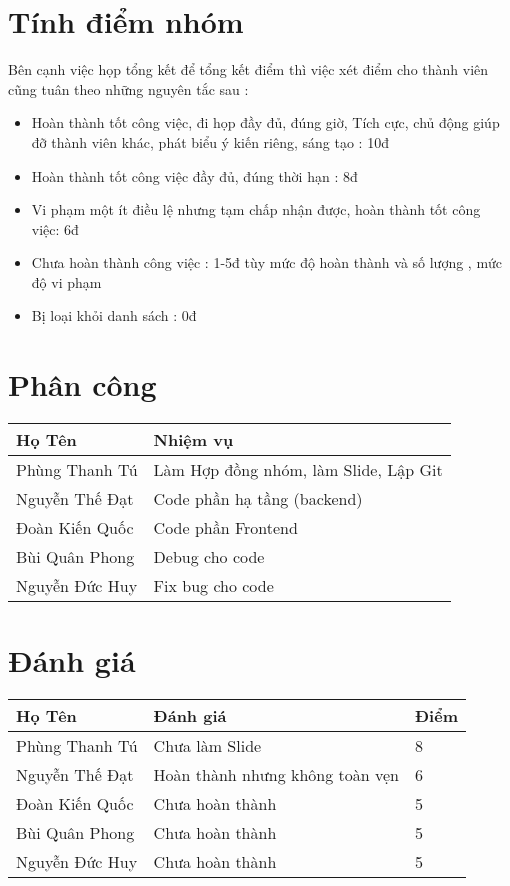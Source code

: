 \documentclass[12pt]{article}
\begin{document}
\begin{titlepage}
\section{Tính điểm nhóm}
Bên cạnh việc họp tổng kết để tổng kết điểm thì việc xét điểm cho thành viên cũng tuân theo những nguyên tắc sau :
\begin{itemize}
    \item Hoàn thành tốt công việc, đi họp đầy đủ, đúng giờ, Tích cực, chủ động giúp đỡ thành viên khác, phát biểu ý kiến riêng, sáng tạo : 10đ
    \item Hoàn thành tốt công việc đầy đủ, đúng thời hạn : 8đ
    \item Vi phạm một ít điều lệ nhưng tạm chấp nhận được, hoàn thành tốt công việc: 6đ
    \item Chưa hoàn thành công việc : 1-5đ tùy mức độ hoàn thành và số lượng , mức độ vi phạm
    \item Bị loại khỏi danh sách : 0đ
    
\end{itemize}

\section{Phân công}
\begin{tabular}{|l|l|} \hline
  Họ Tên   & Nhiệm vụ \\ \hline
    Phùng Thanh Tú  & Làm Hợp đồng nhóm, làm Slide, Lập Git\\ \hline
    Nguyễn Thế Đạt & Code phần hạ tầng (backend) \\ \hline
    Đoàn Kiến Quốc  & Code phần Frontend \\ \hline
    Bùi Quân Phong  & Debug cho code \\ \hline
    Nguyễn Đức Huy  & Fix bug cho code \\ \hline
\end{tabular}

\section{Đánh giá}
\begin{tabular}{|l|l|l|} \hline
  Họ Tên   & Đánh giá & Điểm \\ \hline
    Phùng Thanh Tú  & Chưa làm Slide & 8\\ \hline
    Nguyễn Thế Đạt & Hoàn thành nhưng không toàn vẹn & 6 \\ \hline
    Đoàn Kiến Quốc  & Chưa hoàn thành & 5\\ \hline
    Bùi Quân Phong  & Chưa hoàn thành & 5\\ \hline
    Nguyễn Đức Huy  & Chưa hoàn thành & 5\\ \hline
\end{tabular}


 \end{titlepage}
\end{document}
